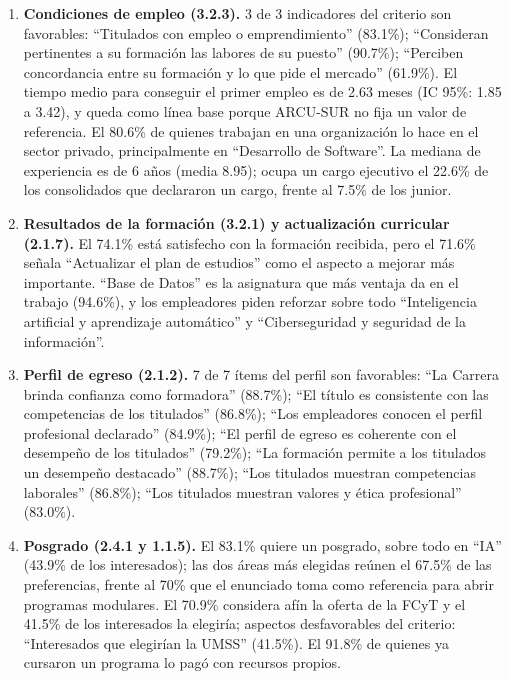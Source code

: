 \begin{enumerate}
  \item \textbf{Condiciones de empleo (3.2.3).} 3 de 3 indicadores del criterio son favorables: ``Titulados con empleo o emprendimiento'' (83.1\%); ``Consideran pertinentes a su formación las labores de su puesto'' (90.7\%); ``Perciben concordancia entre su formación y lo que pide el mercado'' (61.9\%). El tiempo medio para conseguir el primer empleo es de 2.63 meses (IC 95\%: 1.85 a 3.42), y queda como línea base porque ARCU-SUR no fija un valor de referencia. El 80.6\% de quienes trabajan en una organización lo hace en el sector privado, principalmente en ``Desarrollo de Software''. La mediana de experiencia es de 6 años (media 8.95); ocupa un cargo ejecutivo el 22.6\% de los consolidados que declararon un cargo, frente al 7.5\% de los junior.
  \item \textbf{Resultados de la formación (3.2.1) y actualización curricular (2.1.7).} El 74.1\% está satisfecho con la formación recibida, pero el 71.6\% señala ``Actualizar el plan de estudios'' como el aspecto a mejorar más importante. ``Base de Datos'' es la asignatura que más ventaja da en el trabajo (94.6\%), y los empleadores piden reforzar sobre todo ``Inteligencia artificial y aprendizaje automático'' y ``Ciberseguridad y seguridad de la información''.
  \item \textbf{Perfil de egreso (2.1.2).} 7 de 7 ítems del perfil son favorables: ``La Carrera brinda confianza como formadora'' (88.7\%); ``El título es consistente con las competencias de los titulados'' (86.8\%); ``Los empleadores conocen el perfil profesional declarado'' (84.9\%); ``El perfil de egreso es coherente con el desempeño de los titulados'' (79.2\%); ``La formación permite a los titulados un desempeño destacado'' (88.7\%); ``Los titulados muestran competencias laborales'' (86.8\%); ``Los titulados muestran valores y ética profesional'' (83.0\%).
  \item \textbf{Posgrado (2.4.1 y 1.1.5).} El 83.1\% quiere un posgrado, sobre todo en ``IA'' (43.9\% de los interesados); las dos áreas más elegidas reúnen el 67.5\% de las preferencias, frente al 70\% que el enunciado toma como referencia para abrir programas modulares. El 70.9\% considera afín la oferta de la FCyT y el 41.5\% de los interesados la elegiría; aspectos desfavorables del criterio: ``Interesados que elegirían la UMSS'' (41.5\%). El 91.8\% de quienes ya cursaron un programa lo pagó con recursos propios.

\end{enumerate}
